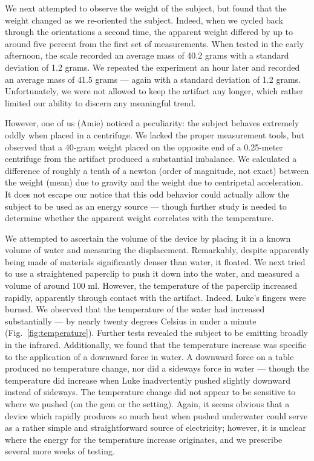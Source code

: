 \documentclass[10pt]{article}
\begin{document}
We next attempted to observe the weight of the subject, but found that the weight changed as we re-oriented the subject.
Indeed, when we cycled back through the orientations a second time, the apparent weight differed by up to around five percent from the first set of measurements.
When tested in the early afternoon, the scale recorded an average mass of 40.2 grams with a standard deviation of 1.2 grams.
We repeated the experiment an hour later and recorded an average mass of 41.5 grams --- again with a standard deviation of 1.2 grams.
Unfortunately, we were not allowed to keep the artifact any longer, which rather limited our ability to discern any meaningful trend.

However, one of us (Amie) noticed a peculiarity: the subject behaves extremely oddly when placed in a centrifuge.
We lacked the proper measurement tools, but observed that a 40-gram weight placed on the opposite end of a 0.25-meter centrifuge from the artifact produced a substantial imbalance.
We calculated a difference of roughly a tenth of a newton (order of magnitude, not exact) between the weight (mean) due to gravity and the weight due to centripetal acceleration.
It does not escape our notice that this odd behavior could actually allow the subject to be used as an energy source --- though further study is needed to determine whether the apparent weight correlates with the temperature.

We attempted to ascertain the volume of the device by placing it in a known volume of water and measuring the displacement.
Remarkably, despite apparently being made of materials significantly denser than water, it floated.
We next tried to use a straightened paperclip to push it down into the water, and measured a volume of around 100 ml.
However, the temperature of the paperclip increased rapidly, apparently through contact with the artifact. 
Indeed, Luke's fingers were burned.
We observed that the temperature of the water had increased substantially --- by nearly twenty degrees Celsius in under a minute (Fig.~\ref{fig:temperature}).
Further tests revealed the subject to be emitting broadly in the infrared.
Additionally, we found that the temperature increase was specific to the application of a downward force in water.
A downward force on a table produced no temperature change, nor did a sideways force in water --- though the temperature did increase when Luke inadvertently pushed slightly downward instead of sideways.
The temperature change did not appear to be sensitive to where we pushed (on the gem or the setting).
Again, it seems obvious that a device which rapidly produces so much heat when pushed underwater could serve as a rather simple and straightforward source of electricity; however, it is unclear where the energy for the temperature increase originates, and we prescribe several more weeks of testing.
\end{document}
